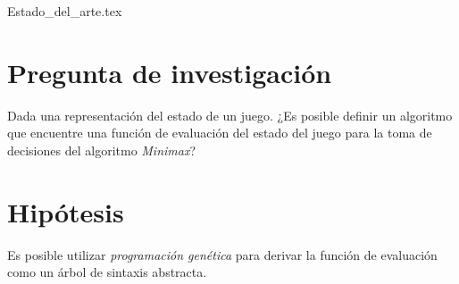 \documentclass[submission]{eptcs}
\begin{document}
  \maketitle


  {Estado_del_arte.tex}










  \section{Pregunta de investigación}
    Dada una representación del estado de un juego. 
    ¿Es posible definir un algoritmo que encuentre una función de evaluación del estado del juego 
    para la toma de decisiones del algoritmo \textit{Minimax}?

  \section{Hipótesis}
    Es posible utilizar \textit{programación genética} para derivar la función de evaluación como
    un árbol de sintaxis abstracta.

\end{document}
